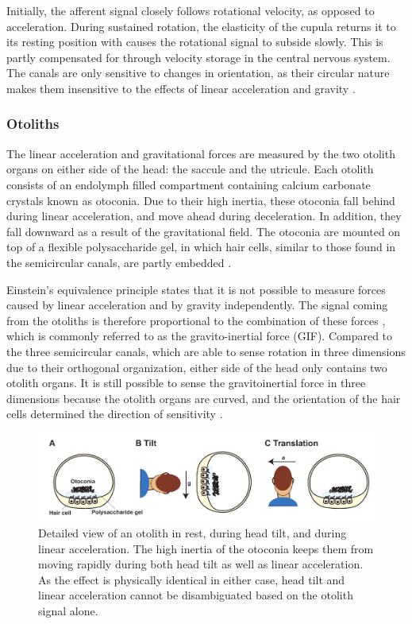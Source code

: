 Initially, the afferent signal closely follows rotational velocity, as opposed to acceleration. During sustained rotation, the elasticity of the cupula returns it to its resting position with causes the rotational signal to subside slowly. This is partly compensated for through velocity storage in the central nervous system. The canals are only sensitive to changes in orientation, as their circular nature makes them insensitive to the effects of linear acceleration and gravity \cite{goldberg2012}. 


\subsubsection{Otoliths}
The linear acceleration and gravitational forces are measured by the two otolith organs on either side of the head: the saccule and the utricule. Each otolith consists of an endolymph filled compartment containing calcium carbonate crystals known as otoconia. Due to their high inertia, these otoconia fall behind during linear acceleration, and move ahead during deceleration. In addition, they fall downward as a result of the gravitational field. The otoconia are mounted on top of a flexible polysaccharide gel, in which hair cells, similar to those found in the semicircular canals, are partly embedded \cite{goldberg2012}.  

Einstein's equivalence principle states that  it is not possible to measure forces caused by linear acceleration and by gravity independently. The signal coming from the otoliths is therefore proportional to the combination of these forces \cite{fernandez1976b}, which is commonly referred to as the gravito-inertial force (GIF). Compared to the three semicircular canals, which are able to sense rotation in three dimensions due to their orthogonal organization, either side of the head only contains two otolith organs. It is still possible to sense the gravitoinertial force in three dimensions because the otolith organs are curved, and the orientation of the hair cells determined the direction of sensitivity \cite{goldberg2012}.

\begin{figure}
    \includegraphics[width=1.0\textwidth]{src/intro/figures/otoliths.pdf}
    \caption{Detailed view of an otolith  in rest,  during head tilt, and  during linear acceleration. The high inertia of the otoconia keeps them from moving rapidly during both head tilt as well as linear acceleration. As the effect is physically identical in either case, head tilt and linear acceleration cannot be disambiguated based on the otolith signal alone.}
    \label{intro:fig7}
\end{figure}

